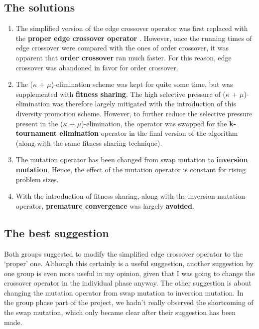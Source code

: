 \documentclass[a4paper,10pt]{article}
\begin{document}
\subsection{The solutions}
\begin{enumerate}
 \item The simplified version of the edge crossover operator was first replaced with the \textbf{proper edge crossover operator} \cite{eiben_smith}. However, once the running times of edge crossover were compared with the ones of order crossover, it was apparent that \textbf{order crossover} ran much faster. For this reason, edge crossover was abandoned in favor for order crossover.
 \item The ($\kappa$ + $\mu$)-elimination scheme was kept for quite some time, but was supplemented with \textbf{fitness sharing}. The high selective pressure of ($\kappa$ + $\mu$)-elimination was therefore largely mitigated with the introduction of this diversity promotion scheme. However, to further reduce the selective pressure present in the ($\kappa$ + $\mu$)-elimination, the operator was swapped for the \textbf{k-tournament elimination} operator in the final version of the algorithm (along with the same fitness sharing technique).
 \item The mutation operator has been changed from swap mutation to \textbf{inversion mutation}. Hence, the effect of the mutation operator is constant for rising problem sizes.
 \item With the introduction of fitness sharing, along with the inversion mutation operator, \textbf{premature convergence} was largely \textbf{avoided}.
\end{enumerate}

\subsection{The best suggestion}
Both groups suggested to modify the simplified edge crossover operator to the `proper' one. Although this certainly is a useful suggestion, another suggestion by one group is even more useful in my opinion, given that I was going to change the crossover operator in the individual phase anyway. The other suggestion is about changing the mutation operator from swap mutation to inversion mutation. In the group phase part of the project, we hadn't really observed the shortcoming of the swap mutation, which only became clear after their suggestion has been made.
\end{document}
